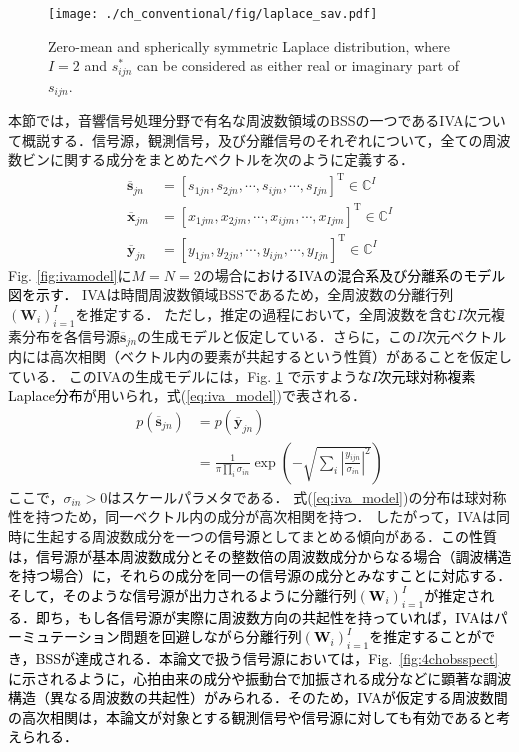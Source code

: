 \begin{figure}[t]
\centering
\texttt{[image: ./ch\_conventional/fig/laplace\_sav.pdf]}
\caption{Zero-mean and spherically symmetric Laplace distribution, where $I=2$ and $s^*_{ijn}$ can be considered as either real or imaginary part of $s_{ijn}$.}
\label{fig:laplace}
\end{figure}
{本節では，音響信号処理分野で有名な周波数領域のBSSの一つであるIVAについて概説する．信号源，観測信号，及び分離信号のそれぞれについて，全ての周波数ビンに関する成分をまとめたベクトルを次のように定義する．}
\begin{align}
    \overline{\bm{s}}_{jn} &= [s_{1jn}, s_{2jn}, \cdots, s_{ijn}, \cdots, s_{Ijn} ]^{\mathrm{T}} \in \mathbb{C}^{I} \\
    \overline{\bm{x}}_{jm} &= [x_{1jm}, x_{2jm}, \cdots, x_{ijm}, \cdots, x_{Ijm} ]^{\mathrm{T}} \in \mathbb{C}^{I} \\
    \overline{\bm{y}}_{jn} &= [y_{1jn}, y_{2jn}, \cdots, y_{ijn}, \cdots, y_{Ijn} ]^{\mathrm{T}} \in \mathbb{C}^{I}
\end{align}
Fig. \ref{fig:ivamodel}に$M=N=2$の場合\textcolor{black}{におけるIVAの混合系及び分離系のモデル図を示す．}
IVAは時間周波数領域BSSであるため，全周波数の分離行列$( \bm{W}_i )_{i=1}^I$を推定する．
ただし，推定の過程{において，}全周波数を含む$I$次元{複素}分布を各信号源{$\overline{\bm{s}}_{jn}$の生成モデルと仮定している．さらに，この}$I$次元ベクトル内には高次相関（ベクトル内の要素が共起するという性質）があることを仮定している．
このIVAの生成モデルには，Fig. \ref{fig:laplace} で示すような\textcolor{black}{$I$次元球対称複素Laplace分布}が用いられ，式(\ref{eq:iva_model})で表される．
\begin{align}
  \nonumber p(\overline{\bm{s}}_{jn}) &= p(\overline{\bm{y}}_{jn}) \\
&= \frac{1}{\pi \prod_{i} \sigma_{in}} \exp \left(  - \sqrt{ \sum_i \left| \frac{y_{ijn}}{\sigma_{in}} \right|^2}  \right)
\label{eq:iva_model}    
\end{align}
ここで，$\sigma_{in}>0$はスケールパラメタである．
式(\ref{eq:iva_model})の分布は球対称性を持つため，同一ベクトル内の成分が高次相関を持つ\cite{Kim2007_iva}．
したがって，IVAは同時に生起する周波数成分を一つの\textcolor{black}{信号源}としてまとめる傾向がある．\textcolor{black}{この性質は，信号源が基本周波数成分とその整数倍の周波数成分からなる場合（調波構造を持つ場合）に，それらの成分を同一の信号源の成分とみなすことに対応する．そして，そのような信号源が出力されるように分離行列$( \bm{W}_i )_{i=1}^I$が推定される．即ち，もし各信号源が実際に周波数方向の共起性を持っていれば，IVAはパーミュテーション問題を回避しながら分離行列$( \bm{W}_i )_{i=1}^I$を推定することができ，BSSが達成される．本論文で扱う信号源においては，Fig.~\ref{fig:4chobsspect}に示されるように，心拍由来の成分や振動台で加振される成分などに顕著な調波構造（異なる周波数の共起性）がみられる．そのため，IVAが仮定する周波数間の高次相関は，本論文が対象とする観測信号や信号源に対しても有効であると考えられる．}

